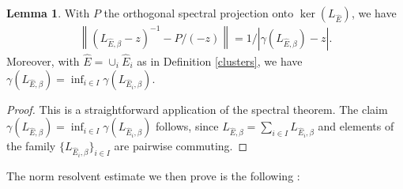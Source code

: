 \documentclass[reqno,12pt,letterpaper]{amsart}
\numberwithin{equation}{section}
\newcommand{\1}{\mathds{1}}
\theoremstyle{definition}
\newtheorem{Lem}[Th]{Lemma}
\begin{document}
\begin{Lem}\label{conv_to_projection}
	 With $P$ the orthogonal spectral projection onto   $\ker(L_{\hat{E}})$, we have
	\begin{align}\label{convergence_to_projection}
		\left\|( L_{\hat{E},\beta} - z)^{-1} - P/(-z) \right\| =
1/|\gamma(L_{\hat{E},\beta}) - z|.
	\end{align}
	Moreover, with $\hat{E} = \cup_i \hat{E}_i$ as in Definition \ref{clusters}, we have $\gamma(L_{\hat{E}, \beta}) = \inf_{i \in I} \gamma(L_{\hat{E}_i, \beta})$.
\end{Lem}
\begin{proof}
This is a straightforward application of the spectral theorem. The claim  $\gamma(L_{\hat{E}, \beta}) = \inf_{i \in I} \gamma(L_{\hat{E}_i, \beta})$ follows, since $L_{\hat{E}, \beta} = \sum_{i \in I } L_{\hat{E}_i, \beta}$ and elements of the family $\{L_{\hat{E}_i, \beta}\}_{i \in I}$ are pairwise commuting.
\end{proof}
	The norm resolvent estimate we then prove is the following :
\end{document}
